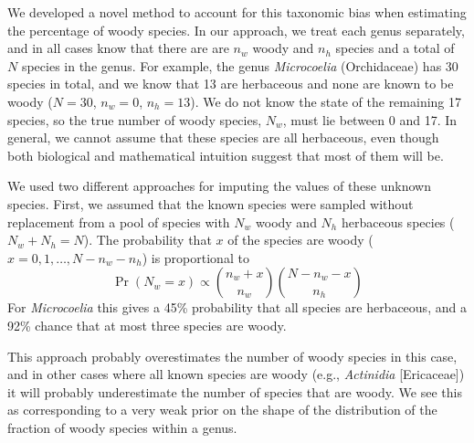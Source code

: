 \documentclass[a4paper,12pt]{article}
\begin{document}

We developed a novel method to account for this taxonomic bias when estimating
the percentage of woody species. 
In our approach, we treat each genus separately,
and in all cases know that there are are $n_w$ woody and $n_h$ species
and a total of $N$ species in the genus.
%
For example, the genus \textit{Microcoelia} (Orchidaceae) has 30
species in total, and we know that 13 are herbaceous and none are
known to be woody ($N = 30$, $n_w = 0$, $n_h = 13$). We do not know
the state of the remaining 17 species, so the true number of woody
species, $N_w$, must lie between 0 and 17. In general, we cannot
assume that these species are all herbaceous, even though both
biological and mathematical intuition suggest that most of them will
be.

We used two different approaches for imputing the values of these
unknown species. First, we assumed that the known species were
sampled without replacement from a pool of species with $N_w$ woody
and $N_h$ herbaceous species ($N_w + N_h = N$). The probability that
$x$ of the species are woody ($x = 0, 1, \ldots, N - n_w - n_h$) is
proportional to
\begin{equation}
  \Pr(N_w = x) \propto {n_w + x \choose n_w}
  {N - n_w - x \choose n_h}
\end{equation}
For \textit{Microcoelia} this gives a 45\% probability that all
species are herbaceous, and a 92\% chance that at most three species
are woody.

This approach probably overestimates the number of woody species in
this case, and in other cases where all known species are woody (e.g.,
\textit{Actinidia} [Ericaceae]) it will probably underestimate the
number of species that are woody. We see this as corresponding to a
very weak prior on the shape of the distribution of the fraction of
woody species within a genus.
\end{document}
